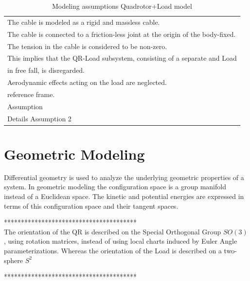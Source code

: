 \begin{table}[h!]
	\centering
	\begin{tabular}{|p{\textwidth}|}
		\hline
		\tabitem The cable is modeled as a rigid and massless cable. \\
		\tabitem The cable is connected to a friction-less joint at the origin of the body-fixed. \\
		\tabitem The tension in the cable is considered to be non-zero.\\
		\hspace{4mm} This implies that the QR-Load subsystem, consisting of a separate \a{qr} and Load\\
		\hspace{4mm} in free fall, is disregarded.\\		 
		\tabitem Aerodynamic effects acting on the load are neglected.\\
		\hspace{4mm} reference frame.\\
		\tabitem Assumption \\
		\hspace{4mm} Details Assumption 2\\
		\hline
	\end{tabular}
	\caption{Modeling assumptions Quadrotor+Load model}
	\label{tab:mod.assumptionsQRL}
\end{table}


\section{Geometric Modeling}\label{sec:mod.geometric}

Differential geometry is used to analyze the underlying geometric properties of a system. In geometric modeling the configuration space is a group manifold instead of a Euclidean space. The kinetic and potential energies are expressed in terms of this configuration space and their tangent spaces.

***************************************\\

The orientation of the QR is described on the Special Orthogonal Group $ SO(3) $, using rotation matrices, instead of using local charts induced by Euler Angle parameterizations. Whereas the orientation of the Load is described on a two-sphere  $ S^2 $

***************************************\\

